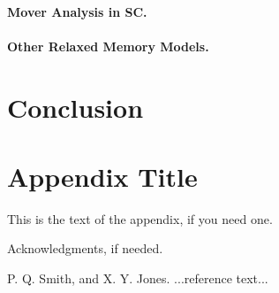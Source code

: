 \documentclass[preprint,9pt]{sigplanconf}
\begin{document}
\paragraph{Mover Analysis in SC.}
\paragraph{Other Relaxed Memory Models.}

\section{Conclusion}


\appendix
\section{Appendix Title}

This is the text of the appendix, if you need one.

\acks

Acknowledgments, if needed.





\begin{thebibliography}{}
\softraggedright

P. Q. Smith, and X. Y. Jones. ...reference text...

\end{thebibliography}
\end{document}
